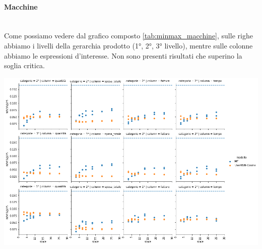 \paragraph{Macchine}\mbox{} \\
Come possiamo vedere dal grafico composto \ref{tab:minmax_macchine}, sulle righe abbiamo i livelli della gerarchia prodotto (1°, 2°, 3° livello), mentre sulle colonne abbiamo le espressioni d'interesse. 
Non sono presenti risultati che superino la soglia critica.
\begin{center}
\includegraphics[width=15cm]{figures/risultati_minmax_categoria_macchine.png}
\label{tab:minmax_macchine}
\end{center}
\newpage

